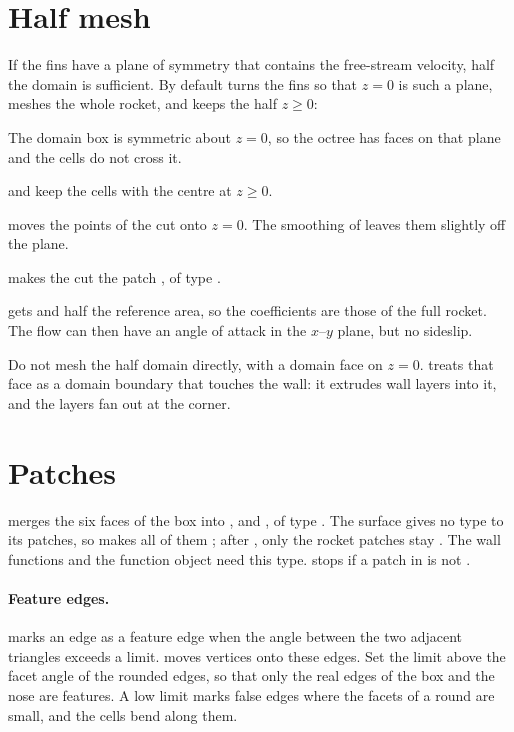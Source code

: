 \section{Half mesh}\label{sec:half-mesh}

If the fins have a plane of symmetry that contains the free-stream velocity, half the
domain is sufficient. By default  turns the fins so that $z = 0$ is such
a plane, meshes the whole rocket, and keeps the half $z \geq 0$:

\begin{steps}
\item The domain box is symmetric about $z = 0$, so the octree has faces on that
  plane and the cells do not cross it.
\item {} and  keep the cells with the centre at $z \geq 0$.
\item {} moves the points of the cut onto $z = 0$. The smoothing of
   leaves them slightly off the plane.
\item {} makes the cut the patch , of type .
\item {} gets  and half the reference area, so the
  coefficients are those of the full rocket. The flow can then have an angle of
  attack in the $x$--$y$ plane, but no sideslip.
\end{steps}

\begin{caution}
Do not mesh the half domain directly, with a domain face on $z = 0$. 
treats that face as a domain boundary that touches the wall: it extrudes wall layers
into it, and the layers fan out at the corner.
\end{caution}

\section{Patches}

 merges the six faces of the box into ,  and
, of type . The  surface gives no type to its patches,
so  makes all of them ; after , only the
rocket patches stay . The wall functions and the  function object
need this type.  stops if a patch in  is not .

\paragraph{Feature edges.}  marks an edge as a feature edge
when the angle between the two adjacent triangles exceeds a limit. 
moves vertices onto these edges. Set the limit above the facet angle of the rounded
edges, so that only the real edges of the box and the nose are features. A low limit
marks false edges where the facets of a round are small, and the cells bend along them.

